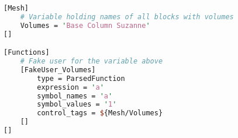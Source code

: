 \begin{lstlisting}[language=Perl, float, caption={Moose input file fragment: variable holding several block names and fake-user},label={geometry-moose-variable-groups}]
[Mesh]
    # Variable holding names of all blocks with volumes
    Volumes = 'Base Column Suzanne'
[]

[Functions]
    # Fake user for the variable above
    [FakeUser_Volumes]
        type = ParsedFunction
        expression = 'a'
        symbol_names = 'a'
        symbol_values = '1'
        control_tags = ${Mesh/Volumes}
    []
[]
\end{lstlisting}

